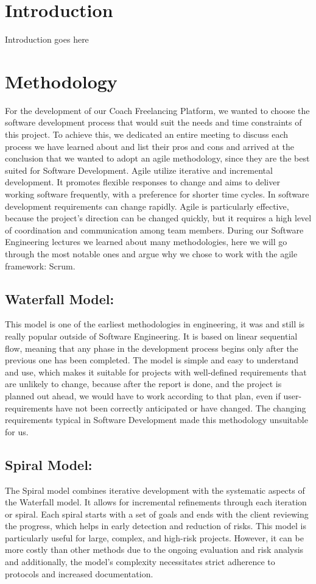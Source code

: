 \section*{Introduction}
Introduction goes here


\clearpage

\section*{Methodology}

For the development of our Coach Freelancing Platform, we wanted to choose the software development process that would suit the needs and time constraints of this project. To achieve this, we dedicated an entire meeting to discuss each process we have learned about and list their pros and cons and arrived at the conclusion that we wanted to adopt an agile methodology, since they are the best suited for Software Development. Agile utilize iterative and incremental development. It promotes flexible responses to change and aims to deliver working software frequently, with a preference for shorter time cycles. In software development requirements can change rapidly. Agile is particularly effective, because the project's direction can be changed quickly, but it requires a high level of coordination and communication among team members.
During our Software Engineering lectures we learned about many methodologies, here we will go through the most notable ones and argue why we chose to work with the agile framework: Scrum.

\subsection*{Waterfall Model:}
This model is one of the earliest methodologies in engineering, it was and still is really popular outside of Software Engineering. It is based on linear sequential flow, meaning that any phase in the development process begins only after the previous one has been completed. The model is simple and easy to understand and use, which makes it suitable for projects with well-defined requirements that are unlikely to change, because after the report is done, and the project is planned out ahead, we would have to work according to that plan, even if user-requirements have not been correctly anticipated or have changed. The changing requirements typical in Software Development made this methodology unsuitable for us. 

\subsection*{Spiral Model:} 
The Spiral model combines iterative development with the systematic aspects of the Waterfall model. It allows for incremental refinements through each iteration or spiral. Each spiral starts with a set of goals and ends with the client reviewing the progress, which helps in early detection and reduction of risks. This model is particularly useful for large, complex, and high-risk projects. However, it can be more costly than other methods due to the ongoing evaluation and risk analysis and additionally, the model's complexity necessitates strict adherence to protocols and increased documentation.

